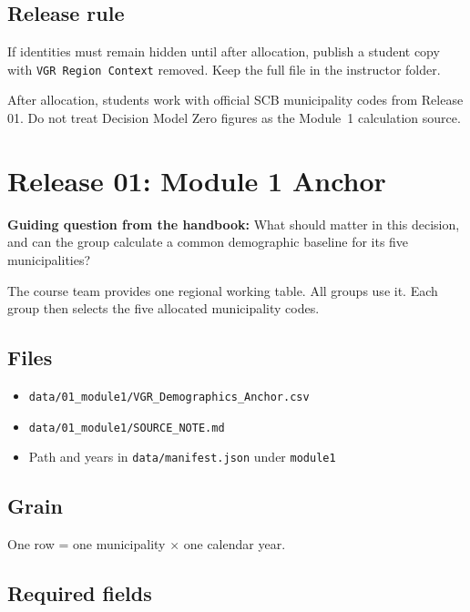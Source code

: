 \documentclass[11pt,a4paper]{article}
\begin{document}
\subsection*{Release rule}

If identities must remain hidden until after allocation, publish a
student copy with \texttt{VGR Region Context} removed. Keep the full
file in the instructor folder.

After allocation, students work with official SCB municipality codes
from Release 01. Do not treat Decision Model Zero figures as the
Module~1 calculation source.

\section{Release 01: Module 1 Anchor}

\textbf{Guiding question from the handbook:}
What should matter in this decision, and can the group calculate a
common demographic baseline for its five municipalities?

The course team provides one regional working table. All groups use it.
Each group then selects the five allocated municipality codes.

\subsection*{Files}

\begin{itemize}
    \item \texttt{data/01\_module1/VGR\_Demographics\_Anchor.csv}
    \item \texttt{data/01\_module1/SOURCE\_NOTE.md}
    \item Path and years in \texttt{data/manifest.json} under
    \texttt{module1}
\end{itemize}

\subsection*{Grain}

One row = one municipality $\times$ one calendar year.

\subsection*{Required fields}
\end{document}
